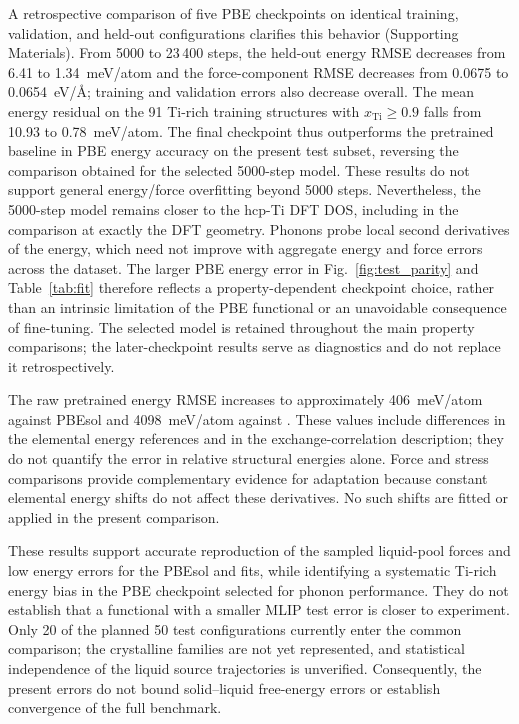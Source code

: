 A retrospective comparison of five PBE checkpoints on identical training, validation, and held-out configurations clarifies this behavior (Supporting Materials).
From 5000 to 23\,400 steps, the held-out energy RMSE decreases from 6.41 to 1.34~meV/atom and the force-component RMSE decreases from 0.0675 to 0.0654~eV/\AA; training and validation errors also decrease overall.
The mean energy residual on the 91 Ti-rich training structures with $x_{\mathrm{Ti}}\geq0.9$ falls from 10.93 to 0.78~meV/atom.
The final checkpoint thus outperforms the pretrained baseline in PBE energy accuracy on the present test subset, reversing the comparison obtained for the selected 5000-step model.
These results do not support general energy/force overfitting beyond 5000 steps.
Nevertheless, the 5000-step model remains closer to the hcp-Ti DFT DOS, including in the comparison at exactly the DFT geometry.
Phonons probe local second derivatives of the energy, which need not improve with aggregate energy and force errors across the dataset.
The larger PBE energy error in Fig.~\ref{fig:test_parity} and Table~\ref{tab:fit} therefore reflects a property-dependent checkpoint choice, rather than an intrinsic limitation of the PBE functional or an unavoidable consequence of fine-tuning.
The selected model is retained throughout the main property comparisons; the later-checkpoint results serve as diagnostics and do not replace it retrospectively.

The raw pretrained energy RMSE increases to approximately 406~meV/atom against PBEsol and 4098~meV/atom against \rscan{}.
These values include differences in the elemental energy references and in the exchange-correlation description; they do not quantify the error in relative structural energies alone.
Force and stress comparisons provide complementary evidence for adaptation because constant elemental energy shifts do not affect these derivatives.
No such shifts are fitted or applied in the present comparison.

These results support accurate reproduction of the sampled liquid-pool forces and low energy errors for the PBEsol and \rscan{} fits, while identifying a systematic Ti-rich energy bias in the PBE checkpoint selected for phonon performance.
They do not establish that a functional with a smaller MLIP test error is closer to experiment.
Only 20 of the planned 50 test configurations currently enter the common comparison; the crystalline families are not yet represented, and statistical independence of the liquid source trajectories is unverified.
Consequently, the present errors do not bound solid--liquid free-energy errors or establish convergence of the full benchmark.

